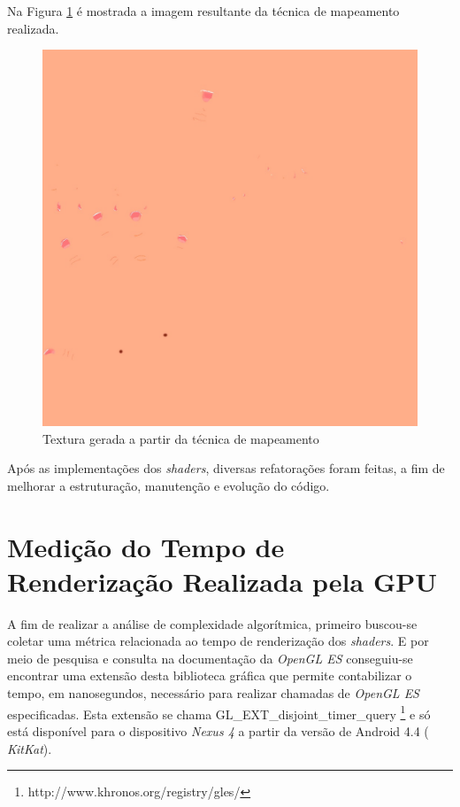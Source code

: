 	Na Figura  \ref{texture_uvmap} é mostrada a imagem resultante da técnica de mapeamento realizada.

	\begin{figure}[h]
	\centering
		\includegraphics[keepaspectratio=true,scale=0.2]{figuras/texture_uvmap.jpg}
	\caption{Textura gerada a partir da técnica de mapeamento}
	\label{texture_uvmap}
	\end{figure}

	Após as implementações dos \textit{shaders}, diversas refatorações foram feitas, a fim de melhorar a estruturação, manutenção e evolução do código.  

\section{Medição do Tempo de Renderização Realizada pela GPU}

	A fim de realizar a análise de complexidade algorítmica, primeiro buscou-se coletar uma métrica relacionada ao tempo de renderização dos \textit{shaders}. E por meio de pesquisa e consulta na documentação da \textit{OpenGL ES} conseguiu-se encontrar uma extensão desta biblioteca gráfica que permite contabilizar o tempo, em nanosegundos, necessário para realizar chamadas de \textit{OpenGL ES} especificadas. Esta extensão se chama GL\_EXT\_disjoint\_timer\_query \footnote{http://www.khronos.org/registry/gles/} e só está disponível para o dispositivo \textit{Nexus 4} a partir da versão de Android 4.4 ( \textit{KitKat}).

